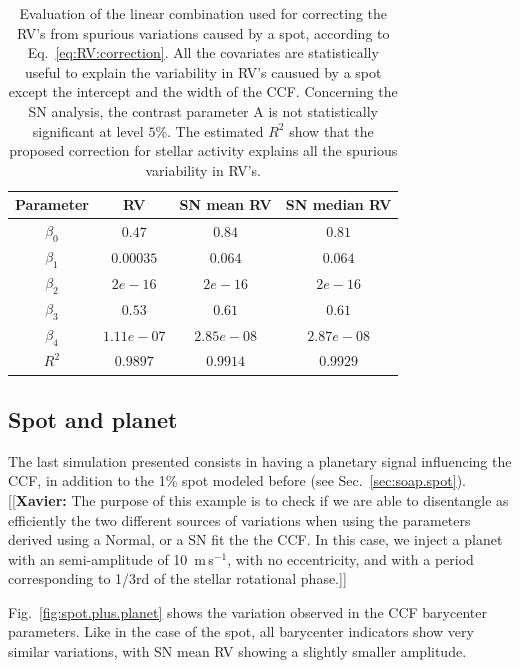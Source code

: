 \documentclass[11pt, oneside]{article}
\def\ms{\hbox{\,m\,s$^{-1}$}}         %
\newcommand{\xavier}[1]{{\color{blue}[[\textbf{Xavier: }#1]]}}
\begin{document}
\begin{table}
\centering
\begin{tabular}{|c|c|c|c|}
\hline
Parameter          & RV         &   SN mean RV &   SN median RV \\
\hline
$\beta_{0}$            &    $0.47$    & $0.84$ & $0.81$ \\
\hline
$\beta_{1}$            &    $0.00035$    & $0.064$ & $0.064$ \\
\hline
$\beta_{2}$            &     $2e-16$   &  $2e-16$ & $2e-16$\\
\hline
$\beta_{3}$            &     $0.53$   &  $0.61$ & $0.61$\\
\hline
$\beta_{4}$            &     $1.11e-07 $   &  $2.85e-08 $ & $ 2.87e-08 $\\
\hline
$R^{2}$      &     $0.9897$    &  $0.9914$ & $0.9929$  \\
\hline
\end{tabular}
\caption{Evaluation of the linear combination used for correcting the RV's from spurious variations caused by a spot, according to Eq.~\ref{eq:RV:correction}. All the covariates are statistically useful to explain the variability in RV's causued by a spot except the intercept and the width of the CCF. Concerning the SN analysis, the contrast parameter A is not statistically significant at level $5\%$. The estimated $R^{2}$ show that the proposed correction for stellar activity explains all the spurious variability in RV's.}
\label{table:spot.test}
\end{table}

\subsection{Spot and planet} \label{sec:soap.spot.planet}

The last simulation presented consists in having a planetary signal influencing the CCF, in addition to the 1\% spot modeled before (see Sec.~\ref{sec:soap.spot}). \xavier{The purpose of this example is to check if we are able to disentangle as efficiently the two different sources of variations when using the parameters derived using a Normal, or a SN fit the the CCF. In this case, we inject a planet with an semi-amplitude of 10 \ms, with no eccentricity, and with a period corresponding to 1/3rd of the stellar rotational phase.}

Fig.~\ref{fig:spot.plus.planet} shows the variation observed in the CCF barycenter parameters. Like in the case of the spot, all barycenter indicators show very similar variations, with SN mean RV showing a slightly smaller amplitude.
\end{document}

